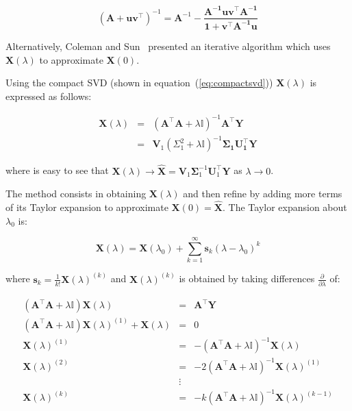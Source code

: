 \begin{equation}
\label{eq:SMW}
(\mathbf{A+uv^\top})^{-1}=\mathbf{A}^{-1}-
\frac{\mathbf{A^{-1}uv^\top A^{-1}}}{\mathbf{1+v^\top A^{-1}u}}
\end{equation}


Alternatively, Coleman and
Sun~\cite{coleman+sun2010} presented an iterative algorithm which
uses $\mathbf{X}(\lambda)$ to approximate $\mathbf{X}(0)$.


Using the compact SVD (shown in equation~(\ref{eq:compactsvd}))
$\mathbf{X}(\lambda)$ is expressed as follows:


\begin{eqnarray}
\label{eq:optsolRRsvd}
\mathbf{X}(\lambda) & = & (\mathbf{A}^\top \mathbf{A}+ \lambda
\mathbb{I})^{-1}\mathbf{A}^\top \mathbf{Y} \nonumber \\
& = &\mathbf{V}_1(\Sigma_1^2+\lambda \mathbb{I})^{-1}\mathbf{\Sigma_1
U_1^\top Y}
\end{eqnarray}

\noindent where is easy to see that $\mathbf{X}(\lambda) \rightarrow
\mathbf{\hat{X}}=\mathbf{V}_1 \mathbf{\Sigma}_1^{-1}\mathbf{U}_1^\top
\mathbf{Y}$ as $\lambda \rightarrow 0$. 

The method consists in obtaining $\mathbf{X}(\lambda)$ and then refine
by adding more terms of its Taylor expansion to approximate
$\mathbf{X}(0) = \mathbf{\hat{X}}$. The Taylor expansion about $\lambda_0$ is:

\begin{equation}
\label{eq:taylor}
    \mathbf{X}(\lambda)=\mathbf{X}(\lambda_0) + \sum_{k=1}^\infty
    \mathbf{s}_k(\lambda-\lambda_0)^{k}
\end{equation}


\noindent where $\mathbf{s}_k=\frac{1}{k!}\mathbf{X}(\lambda)^{(k)}$
and $\mathbf{X}(\lambda)^{(k)}$ is obtained by taking differences 
$\frac{\partial}{\partial \lambda}$ of:  

\begin{eqnarray*}
(\mathbf{A}^\top \mathbf{A}+ \lambda\mathbb{I}) \mathbf{X}(\lambda) & = & \mathbf{A}^\top \mathbf{Y}\\
(\mathbf{A}^\top \mathbf{A}+ \lambda\mathbb{I}) \mathbf{X}(\lambda)^{(1)} + \mathbf{X}(\lambda)& = & 0 \\
\mathbf{X}(\lambda)^{(1)}  &=& -(\mathbf{A}^\top \mathbf{A}+ \lambda\mathbb{I}) ^{-1} \mathbf{X}(\lambda) \\
\mathbf{X}(\lambda)^{(2)}  &=& -2(\mathbf{A}^\top \mathbf{A}+ \lambda\mathbb{I}) ^{-1} \mathbf{X}(\lambda)^{(1)} \\
& \vdots & \\
\mathbf{X}(\lambda)^{(k)}  &=& -k(\mathbf{A}^\top \mathbf{A}+ \lambda\mathbb{I}) ^{-1} \mathbf{X}(\lambda)^{(k-1)} 
\end{eqnarray*}




